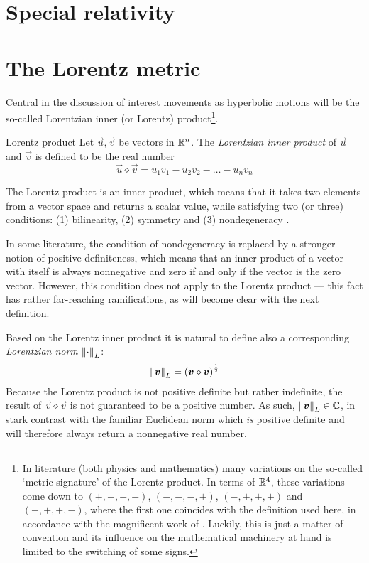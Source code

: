\section{Special relativity}

\section{The Lorentz metric}
\label{sec:lorentz_metric}
Central in the discussion of interest movements as hyperbolic motions will be the so-called Lorentzian inner (or Lorentz) product\footnote{In literature (both physics and mathematics) many variations on the so-called `metric signature' of the Lorentz product. In terms of \(\mathbb{R}^4\), these variations come down to \((+,-,-,-)\), \((-,-,-,+)\), \((-,+,+,+)\) and \((+,+,+,-)\), where the first one coincides with the definition used here, in accordance with the magnificent work of \citet{Landau1971}. Luckily, this is just a matter of convention and its influence on the mathematical machinery at hand is limited to the switching of some signs.}.
\begin{block}{Lorentz product}
    Let \(\vec{u}, \vec{v}\) be vectors in \(\mathbb{R}^n\). The \emph{Lorentzian inner product} of \(\vec{u}\) and \(\vec{v}\) is defined to be the real number
    \[
     \vec{u} \diamond \vec{v} = u_1v_1 - u_2v_2 - \ldots - u_nv_n
\]
\end{block}
The Lorentz product is an inner product, which means that it takes two elements from a vector space and returns a scalar value, while satisfying two (or three) conditions: (1) bilinearity, (2) symmetry and (3) nondegeneracy \cite{Ratcliffe2019}.

In some literature, the condition of nondegeneracy is replaced by a stronger notion of positive definiteness, which means that an inner product of a vector with itself is always nonnegative and zero if and only if the vector is the zero vector. However, this condition does not apply to the Lorentz product --- this fact has rather far-reaching ramifications, as will become clear with the next definition. 

Based on the Lorentz inner product it is natural to define also a corresponding \emph{Lorentzian norm} \(\norm{\cdot}_L\):
    \[
     \norm{\vb*{v}}_L = \qty(\vb*{v}\diamond\vb*{v})^\frac{1}{2}
\]
Because the Lorentz product is not positive definite but rather indefinite, the result of \(\vec{v}\diamond\vec{v}\) is not guaranteed to be a positive number. As such, \(\norm{\vb*{v}}_L \in \mathbb{C}\), in stark contrast with the familiar Euclidean norm which \emph{is} positive definite and will therefore always return a nonnegative real number.

